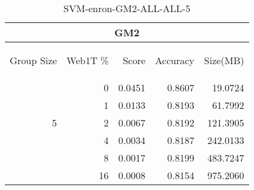 \begin{center}
\begin{table}[htbp] 
 \begin{center}
\begin{tabular}{ | r | r | r | r | r |}
\hline
\multicolumn{5}{|c|}{GM2}\\
\hline
\begin{sideways}Group Size\end{sideways} & \begin{sideways}Web1T \%\end{sideways} & \begin{sideways}Score\end{sideways} & \begin{sideways}Accuracy\end{sideways} & \begin{sideways}Size(MB)\end{sideways}\\
\hline
\multirow{5}{*}{5}
 & 0 & 0.0451 & 0.8607 & 19.0724\\ \cline{2-5}
 & 1 & 0.0133 & 0.8193 & 61.7992\\ \cline{2-5}
 & 2 & 0.0067 & 0.8192 & 121.3905\\ \cline{2-5}
 & 4 & 0.0034 & 0.8187 & 242.0133\\ \cline{2-5}
 & 8 & 0.0017 & 0.8199 & 483.7247\\ \cline{2-5}
 & 16 & 0.0008 & 0.8154 & 975.2060\\ \cline{2-5}
\hline
\end{tabular}
\caption{SVM-enron-GM2-ALL-ALL-5}
\label{table:SVM-enron-GM2-ALL-ALL-5}
\end{center}
 \end{table}
\end{center}

